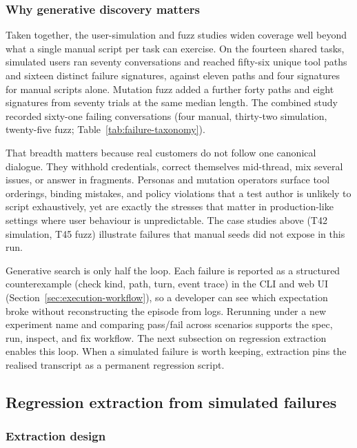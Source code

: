 \subsubsection{Why generative discovery matters}

Taken together, the user-simulation and fuzz studies widen coverage well beyond what a single manual script per task can exercise. On the fourteen shared tasks, simulated users ran seventy conversations and reached fifty-six unique tool paths and sixteen distinct failure signatures, against eleven paths and four signatures for manual scripts alone. Mutation fuzz added a further forty paths and eight signatures from seventy trials at the same median length. The combined study recorded sixty-one failing conversations (four manual, thirty-two simulation, twenty-five fuzz; Table~\ref{tab:failure-taxonomy}).

That breadth matters because real customers do not follow one canonical dialogue. They withhold credentials, correct themselves mid-thread, mix several issues, or answer in fragments. Personas and mutation operators surface tool orderings, binding mistakes, and policy violations that a test author is unlikely to script exhaustively, yet are exactly the stresses that matter in production-like settings where user behaviour is unpredictable. The case studies above (T42 simulation, T45 fuzz) illustrate failures that manual seeds did not expose in this run.

Generative search is only half the loop. Each failure is reported as a structured counterexample (check kind, path, turn, event trace) in the CLI and web UI (Section~\ref{sec:execution-workflow}), so a developer can see which expectation broke without reconstructing the episode from logs. Rerunning under a new experiment name and comparing pass/fail across scenarios supports the spec, run, inspect, and fix workflow. The next subsection on regression extraction enables this loop. When a simulated failure is worth keeping, extraction pins the realised transcript as a permanent regression script.

\subsection{Regression extraction from simulated failures}

\subsubsection{Extraction design}

